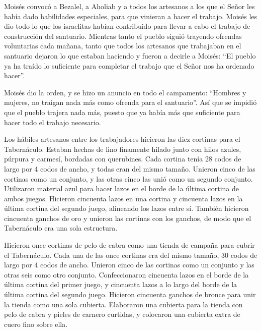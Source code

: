 Moisés convocó a Bezalel, a Aholiab y a todos los artesanos
a los que el Señor les había dado habilidades especiales, para que
vinieran a hacer el trabajo.  Moisés les dio todo lo que los
israelitas habían contribuido para llevar a cabo el trabajo de
construcción del santuario. Mientras tanto el pueblo siguió trayendo
ofrendas voluntarias cada mañana,  tanto que todos los
artesanos que trabajaban en el santuario dejaron lo que estaban haciendo
 y fueron a decirle a Moisés: ``El pueblo ya ha traído lo
suficiente para completar el trabajo que el Señor nos ha ordenado
hacer''.

 Moisés dio la orden, y se hizo un anuncio en todo el
campamento: ``Hombres y mujeres, no traigan nada más como ofrenda para
el santuario''. Así que se impidió que el pueblo trajera nada más,
 puesto que ya había más que suficiente para hacer todo el
trabajo necesario.

 Los hábiles artesanos entre los trabajadores hicieron las
diez cortinas para el Tabernáculo. Estaban hechas de lino finamente
hilado junto con hilos azules, púrpura y carmesí, bordadas con
querubines.  Cada cortina tenía 28 codos de largo por 4
codos de ancho, y todas eran del mismo tamaño.  Unieron
cinco de las cortinas como un conjunto, y las otras cinco las unió como
un segundo conjunto.  Utilizaron material azul para hacer
lazos en el borde de la última cortina de ambos juegos. 
Hicieron cincuenta lazos en una cortina y cincuenta lazos en la última
cortina del segundo juego, alineando los lazos entre sí. 
También hicieron cincuenta ganchos de oro y unieron las cortinas con los
ganchos, de modo que el Tabernáculo era una sola estructura.

 Hicieron once cortinas de pelo de cabra como una tienda de
campaña para cubrir el Tabernáculo.  Cada una de las once
cortinas era del mismo tamaño, 30 codos de largo por 4 codos de ancho.
 Unieron cinco de las cortinas como un conjunto y las otras
seis como otro conjunto.  Confeccionaron cincuenta lazos en
el borde de la última cortina del primer juego, y cincuenta lazos a lo
largo del borde de la última cortina del segundo juego. 
Hicieron cincuenta ganchos de bronce para unir la tienda como una sola
cubierta.  Elaboraron una cubierta para la tienda con pelo
de cabra y pieles de carnero curtidas, y colocaron una cubierta extra de
cuero fino sobre ella.

